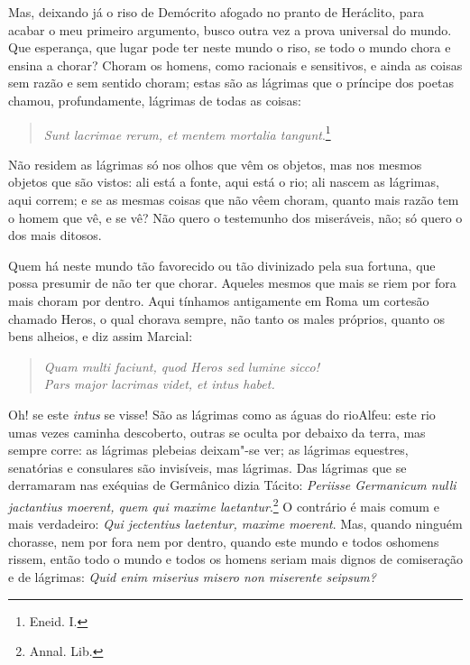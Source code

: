 Mas, deixando já o riso de Demócrito afogado no pranto de Heráclito,
para acabar o meu primeiro argumento, busco outra vez a prova universal
do mundo. Que esperança, que lugar pode ter neste mundo o riso, se todo
o mundo chora e ensina a chorar? Choram os homens, como racionais e
sensitivos, e ainda as coisas sem razão e sem sentido choram; estas são
as lágrimas que o príncipe dos poetas chamou, profundamente, lágrimas de
todas as coisas:

\begin{verse}
\emph{Sunt lacrimae rerum, et mentem mortalia tangunt}.\footnote{Eneid. I.}
\end{verse}

Não residem as lágrimas só nos olhos que vêm os objetos, mas nos mesmos
objetos que são vistos: ali está a fonte, aqui está o rio; ali nascem as
lágrimas, aqui correm; e se as mesmas coisas que não vêem choram, quanto
mais razão tem o homem que vê, e se vê? Não quero o testemunho dos
miseráveis, não; só quero o dos mais ditosos.

Quem há neste mundo tão favorecido ou tão divinizado pela sua fortuna,
que possa presumir de não ter que chorar. Aqueles mesmos que mais se
riem por fora mais choram por dentro. Aqui tínhamos antigamente em Roma
um cortesão chamado Heros, o qual chorava sempre, não tanto os males
próprios, quanto os bens alheios, e diz assim Marcial:

\begin{verse}
\emph{Quam multi faciunt, quod Heros sed lumine sicco!}\\
\emph{Pars major lacrimas videt, et intus habet.}
\end{verse}

Oh! se este \emph{intus} se visse! São as lágrimas como as águas do rioAlfeu:
este rio umas vezes caminha descoberto, outras se oculta por debaixo da
terra, mas sempre corre: as lágrimas plebeias deixam"-se ver; as lágrimas
equestres, senatórias e consulares são invisíveis, mas lágrimas. Das
lágrimas que se derramaram nas exéquias de Germânico dizia Tácito:
\emph{Periisse Germanicum nulli jactantius moerent, quem qui maxime
laetantur}.\footnote{Annal. Lib.} O contrário é mais comum e mais
verdadeiro: \emph{Qui jectentius laetentur, maxime
moerent}. Mas, quando ninguém chorasse, nem por
fora nem por dentro, quando este mundo e todos oshomens rissem, então
todo o mundo e todos os homens seriam mais dignos de comiseração e de
lágrimas: \emph{Quid enim miserius misero non miserente
seipsum?}


